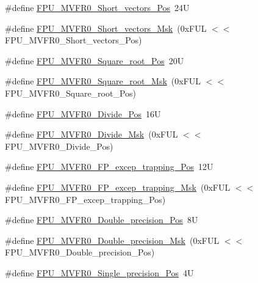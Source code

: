 \begin{DoxyCompactItemize}
\item 
\#define \hyperlink{group___c_m_s_i_s___f_p_u_gabbf83a918536ebf10889cee71a0404c7}{F\+P\+U\+\_\+\+M\+V\+F\+R0\+\_\+\+Short\+\_\+vectors\+\_\+\+Pos}~24U
\item 
\#define \hyperlink{group___c_m_s_i_s___f_p_u_gabf261a72023fdfc64f32c6b21d55c5b9}{F\+P\+U\+\_\+\+M\+V\+F\+R0\+\_\+\+Short\+\_\+vectors\+\_\+\+Msk}~(0x\+F\+U\+L $<$$<$ F\+P\+U\+\_\+\+M\+V\+F\+R0\+\_\+\+Short\+\_\+vectors\+\_\+\+Pos)
\item 
\#define \hyperlink{group___c_m_s_i_s___f_p_u_ga176c85453ba03257bf263adec05f7344}{F\+P\+U\+\_\+\+M\+V\+F\+R0\+\_\+\+Square\+\_\+root\+\_\+\+Pos}~20U
\item 
\#define \hyperlink{group___c_m_s_i_s___f_p_u_ga3ec0bfec1640bdaf9dff027f275b446d}{F\+P\+U\+\_\+\+M\+V\+F\+R0\+\_\+\+Square\+\_\+root\+\_\+\+Msk}~(0x\+F\+U\+L $<$$<$ F\+P\+U\+\_\+\+M\+V\+F\+R0\+\_\+\+Square\+\_\+root\+\_\+\+Pos)
\item 
\#define \hyperlink{group___c_m_s_i_s___f_p_u_ga167be203091e6cc7d00ad40ca48c4396}{F\+P\+U\+\_\+\+M\+V\+F\+R0\+\_\+\+Divide\+\_\+\+Pos}~16U
\item 
\#define \hyperlink{group___c_m_s_i_s___f_p_u_gaeb7370768c6cdf06f8a15c86c6102ed2}{F\+P\+U\+\_\+\+M\+V\+F\+R0\+\_\+\+Divide\+\_\+\+Msk}~(0x\+F\+U\+L $<$$<$ F\+P\+U\+\_\+\+M\+V\+F\+R0\+\_\+\+Divide\+\_\+\+Pos)
\item 
\#define \hyperlink{group___c_m_s_i_s___f_p_u_ga5c0715c41c4470f8bb0b6dcd34707f1c}{F\+P\+U\+\_\+\+M\+V\+F\+R0\+\_\+\+F\+P\+\_\+excep\+\_\+trapping\+\_\+\+Pos}~12U
\item 
\#define \hyperlink{group___c_m_s_i_s___f_p_u_ga29bbddd679e821e050699fda23e6c85e}{F\+P\+U\+\_\+\+M\+V\+F\+R0\+\_\+\+F\+P\+\_\+excep\+\_\+trapping\+\_\+\+Msk}~(0x\+F\+U\+L $<$$<$ F\+P\+U\+\_\+\+M\+V\+F\+R0\+\_\+\+F\+P\+\_\+excep\+\_\+trapping\+\_\+\+Pos)
\item 
\#define \hyperlink{group___c_m_s_i_s___f_p_u_ga461e26147be0c39402a78cb6249e8f84}{F\+P\+U\+\_\+\+M\+V\+F\+R0\+\_\+\+Double\+\_\+precision\+\_\+\+Pos}~8U
\item 
\#define \hyperlink{group___c_m_s_i_s___f_p_u_ga3f2c8c6c759ffe70f548a165602ea901}{F\+P\+U\+\_\+\+M\+V\+F\+R0\+\_\+\+Double\+\_\+precision\+\_\+\+Msk}~(0x\+F\+U\+L $<$$<$ F\+P\+U\+\_\+\+M\+V\+F\+R0\+\_\+\+Double\+\_\+precision\+\_\+\+Pos)
\item 
\#define \hyperlink{group___c_m_s_i_s___f_p_u_ga1b4e9fe31992b1495c7a158747d42571}{F\+P\+U\+\_\+\+M\+V\+F\+R0\+\_\+\+Single\+\_\+precision\+\_\+\+Pos}~4U
\item 
$$
\end{DoxyCompactItemize}
